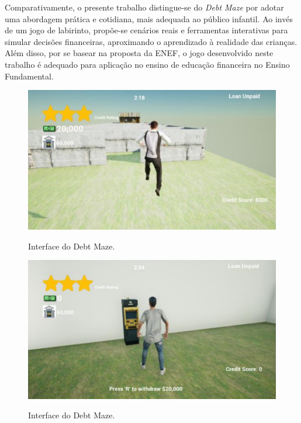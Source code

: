 Comparativamente, o presente trabalho distingue-se do \textit{Debt Maze} por adotar uma abordagem prática e cotidiana, mais adequada ao público infantil. Ao invés de um jogo de labirinto, propõe-se cenários reais e ferramentas interativas para simular decisões financeiras, aproximando o aprendizado à realidade das crianças. Além disso, por se basear na proposta da ENEF, o jogo desenvolvido neste trabalho é adequado para aplicação no ensino de educação financeira no Ensino Fundamental.



\begin{figure}[ht]
	\centering
	\caption{Interface do Debt Maze.}
	\includegraphics[scale=0.9]{Textuais/Pictures/debt-maze-1.png}
	\label{fig:debt-maze-1}
\end{figure}

\begin{figure}[ht]
	\centering
	\caption{Interface do Debt Maze.}
	\includegraphics[scale=0.8]{Textuais/Pictures/debt-maze-2.png}
	\label{fig:debt-maze-2}
\end{figure}

